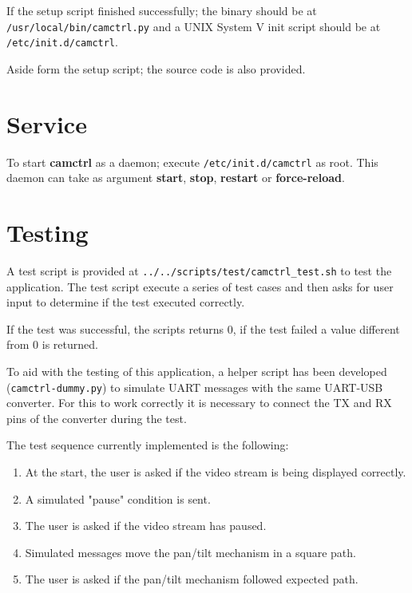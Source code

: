 If the setup script finished successfully; the binary should be at\\
\texttt{/usr/local/bin/camctrl.py} and a UNIX System V init script should be
at\\ \texttt{/etc/init.d/camctrl}.

Aside form the setup script; the source code is also provided.

\section{Service} \label{sec:service}
To start \textbf{camctrl} as a daemon; execute \texttt{/etc/init.d/camctrl}
as root. This daemon can take as argument \textbf{start}, \textbf{stop},
\textbf{restart} or \textbf{force-reload}.

\section{Testing}
A test script is provided at \texttt{../../scripts/test/camctrl\_test.sh} to
test the application. The test script execute a series of test cases and then
asks for user input to determine if the test executed correctly.

If the test was successful, the scripts returns 0, if the test failed a value
different from 0 is returned.

To aid with the testing of this application, a helper script has been developed
(\texttt{camctrl-dummy.py}) to simulate UART messages with the same UART-USB
converter. For this to work correctly it is necessary to connect the TX and RX
pins of the converter during the test.

The test sequence currently implemented is the following:

   \begin{enumerate}
      \item At the start, the user is asked if the video stream is being
         displayed correctly.
      \item A simulated "pause" condition is sent.
      \item The user is asked if the video stream has paused.
      \item Simulated messages move the pan/tilt mechanism in a square path.
      \item The user is asked if the pan/tilt mechanism followed expected path.
   \end{enumerate}

